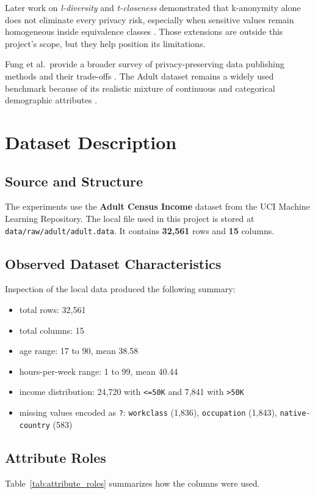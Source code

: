 \documentclass[11pt]{article}
\begin{document}
Later work on \textit{l-diversity} and \textit{t-closeness} demonstrated that k-anonymity alone does not eliminate every privacy risk, especially when sensitive values remain homogeneous inside equivalence classes \cite{Machanavajjhala2007,Li2007}. Those extensions are outside this project's scope, but they help position its limitations.

Fung et al.\ provide a broader survey of privacy-preserving data publishing methods and their trade-offs \cite{Fung2010}. The Adult dataset remains a widely used benchmark because of its realistic mixture of continuous and categorical demographic attributes \cite{Kohavi1996,UCIAdult}.

\section{Dataset Description}
\subsection{Source and Structure}
The experiments use the \textbf{Adult Census Income} dataset from the UCI Machine Learning Repository. The local file used in this project is stored at \texttt{data/raw/adult/adult.data}. It contains \textbf{32,561} rows and \textbf{15} columns.

\subsection{Observed Dataset Characteristics}
Inspection of the local data produced the following summary:
\begin{itemize}[leftmargin=*]
    \item total rows: 32,561
    \item total columns: 15
    \item age range: 17 to 90, mean 38.58
    \item hours-per-week range: 1 to 99, mean 40.44
    \item income distribution: 24,720 with \texttt{<=50K} and 7,841 with \texttt{>50K}
    \item missing values encoded as \texttt{?}: \texttt{workclass} (1,836), \texttt{occupation} (1,843), \texttt{native-country} (583)
\end{itemize}

\subsection{Attribute Roles}
Table~\ref{tab:attribute_roles} summarizes how the columns were used.
\end{document}
